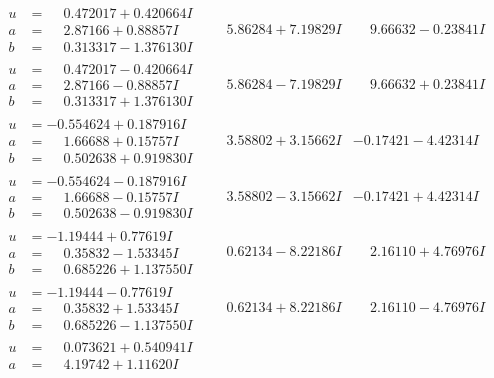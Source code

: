 \documentclass[1p]{elsarticle_modified}
\theoremstyle{definition}
\begin{document}
$$\begin{array}{c|c|c}
\begin{aligned}
u &= \phantom{-}0.472017 + 0.420664 I \\
a &= \phantom{-}2.87166 + 0.88857 I \\
b &= \phantom{-}0.313317 - 1.376130 I\end{aligned}
 & \phantom{-}5.86284 + 7.19829 I & \phantom{-}9.66632 - 0.23841 I \\ \hline\begin{aligned}
u &= \phantom{-}0.472017 - 0.420664 I \\
a &= \phantom{-}2.87166 - 0.88857 I \\
b &= \phantom{-}0.313317 + 1.376130 I\end{aligned}
 & \phantom{-}5.86284 - 7.19829 I & \phantom{-}9.66632 + 0.23841 I \\ \hline\begin{aligned}
u &= -0.554624 + 0.187916 I \\
a &= \phantom{-}1.66688 + 0.15757 I \\
b &= \phantom{-}0.502638 + 0.919830 I\end{aligned}
 & \phantom{-}3.58802 + 3.15662 I & -0.17421 - 4.42314 I \\ \hline\begin{aligned}
u &= -0.554624 - 0.187916 I \\
a &= \phantom{-}1.66688 - 0.15757 I \\
b &= \phantom{-}0.502638 - 0.919830 I\end{aligned}
 & \phantom{-}3.58802 - 3.15662 I & -0.17421 + 4.42314 I \\ \hline\begin{aligned}
u &= -1.19444 + 0.77619 I \\
a &= \phantom{-}0.35832 - 1.53345 I \\
b &= \phantom{-}0.685226 + 1.137550 I\end{aligned}
 & \phantom{-}0.62134 - 8.22186 I & \phantom{-}2.16110 + 4.76976 I \\ \hline\begin{aligned}
u &= -1.19444 - 0.77619 I \\
a &= \phantom{-}0.35832 + 1.53345 I \\
b &= \phantom{-}0.685226 - 1.137550 I\end{aligned}
 & \phantom{-}0.62134 + 8.22186 I & \phantom{-}2.16110 - 4.76976 I \\ \hline\begin{aligned}
u &= \phantom{-}0.073621 + 0.540941 I \\
a &= \phantom{-}4.19742 + 1.11620 I \\

\end{aligned}
\end{array}$$
\end{document}
